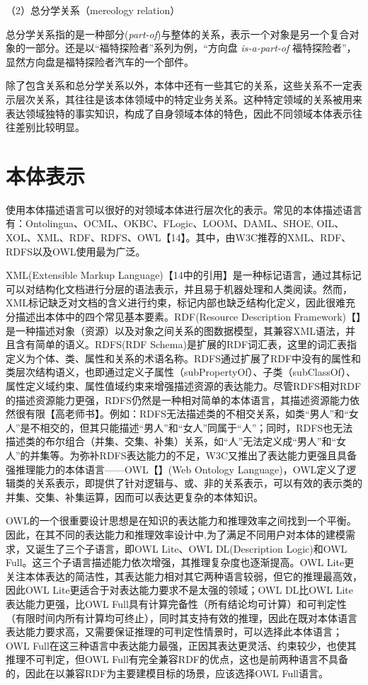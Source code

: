 （2）总分学关系（mereology relation）

总分学关系指的是一种部分(\textit{part-of})与整体的关系，表示一个对象是另一个复合对象的一部分。还是以“福特探险者”系列为例，“方向盘 \textit{is-a-part-of} 福特探险者”，显然方向盘是福特探险者汽车的一个部件。

除了包含关系和总分学关系以外，本体中还有一些其它的关系，这些关系不一定表示层次关系，其往往是该本体领域中的特定业务关系。这种特定领域的关系被用来表达领域独特的事实知识，构成了自身领域本体的特色，因此不同领域本体表示往往差别比较明显。

\section{本体表示}
使用本体描述语言可以很好的对领域本体进行层次化的表示。常见的本体描述语言有：Ontolingua、OCML、OKBC、FLogic、LOOM、DAML、SHOE, OIL、XOL、XML、RDF、RDFS、OWL【14】。其中，由W3C推荐的XML、RDF、RDFS以及OWL使用最为广泛。

XML(Extensible Markup Language)【14中的引用】是一种标记语言，通过其标记可以对结构化文档进行分层的语法表示，并且易于机器处理和人类阅读。然而，XML标记缺乏对文档的含义进行约束，标记内部也缺乏结构化定义，因此很难充分描述出本体中的四个常见基本要素。RDF(Resource Description Framework)【】是一种描述对象（资源）以及对象之间关系的图数据模型，其兼容XML语法，并且含有简单的语义。RDFS(RDF Schema)是扩展的RDF词汇表，这里的词汇表指定义为个体、类、属性和关系的术语名称。RDFS通过扩展了RDF中没有的属性和类层次结构语义，也即通过定义子属性（subPropertyOf）、子类（subClassOf）、属性定义域约束、属性值域约束来增强描述资源的表达能力。尽管RDFS相对RDF的描述资源能力更强，RDFS仍然是一种相对简单的本体语言，其描述资源能力依然很有限【高老师书】。例如：RDFS无法描述类的不相交关系，如类“男人”和“女人”是不相交的，但其只能描述“男人”和“女人”同属于“人”；同时，RDFS也无法描述类的布尔组合（并集、交集、补集）关系，如“人”无法定义成“男人”和“女人”的并集等。为弥补RDFS表达能力的不足，W3C又推出了表达能力更强且具备强推理能力的本体语言——OWL【】(Web Ontology Language)，OWL定义了逻辑类的关系表示，即提供了针对逻辑与、或、非的关系表示，可以有效的表示类的并集、交集、补集运算，因而可以表达更复杂的本体知识。

OWL的一个很重要设计思想是在知识的表达能力和推理效率之间找到一个平衡。因此，在其不同的表达能力和推理效率设计中,为了满足不同用户对本体的建模需求，又诞生了三个子语言，即OWL Lite、OWL DL(Description Logic)和OWL Full。这三个子语言描述能力依次增强，其推理复杂度也逐渐提高。OWL Lite更关注本体表达的简洁性，其表达能力相对其它两种语言较弱，但它的推理最高效，因此OWL Lite更适合于对表达能力要求不是太强的领域；OWL DL比OWL Lite表达能力更强，比OWL Full具有计算完备性（所有结论均可计算）和可判定性（有限时间内所有计算均可终止），同时其支持有效的推理，因此在既对本体语言表达能力要求高，又需要保证推理的可判定性情景时，可以选择此本体语言；OWL Full在这三种语言中表达能力最强，正因其表达更灵活、约束较少，也使其推理不可判定，但OWL Full有完全兼容RDF的优点，这也是前两种语言不具备的，因此在以兼容RDF为主要建模目标的场景，应该选择OWL Full语言。

